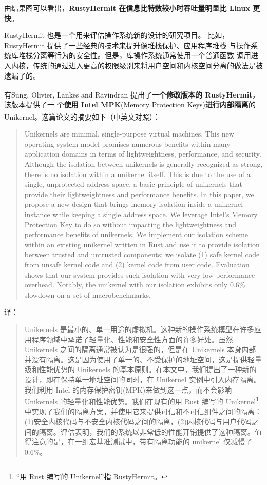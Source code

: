 \documentclass[UTF8,fontset=none,linespread=1.15]{ctexart}
\let\nosupcite\cite
\renewcommand*{\cite}[1]{\textsuperscript{\nosupcite{#1}}}
\begin{document}
由结果图可以看出，\textbf{RustyHermit 在信息比特数较小时吞吐量明显比 Linux 更快}。

RustyHermit 也是一个用来评估操作系统新的设计的研究项目。
比如，RustyHermit 提供了一些经典的技术来提升像堆栈保护、应用程序堆栈
与操作系统库堆栈分离等行为的安全性。但是，库操作系统通常使用一个普通函数
调用进入内核，传统的通过进入更高的权限级别来将用户空间和内核空间分离的做法是被遗漏了的。

有Sung, Olivier, Lankes and Ravindran\cite{bib:18-intra-unikernel}
提出了\textbf{一个修改版本的 RustyHermit}，该版本提供了一
个\textbf{使用 Intel MPK}(Memory Protection Keys)\textbf{进行内部隔离}的
Unikernel。这篇论文的摘要如下（中英文对照）：\cite{bib:19-mpk}

\begin{quote}
Unikernels are minimal, single-purpose virtual machines. This new operating system model promises numerous benefits within many application domains in terms of lightweightness, performance, and security. Although the isolation between unikernels is generally recognized as strong, there is no isolation within a unikernel itself. This is due to the use of a single, unprotected address space, a basic principle of unikernels that provide their lightweightness and performance benefits. In this paper, we propose a new design that brings memory isolation inside a unikernel instance while keeping a single address space. We leverage Intel's Memory Protection Key to do so without impacting the lightweightness and performance benefits of unikernels. We implement our isolation scheme within an existing unikernel written in Rust and use it to provide isolation between trusted and untrusted components: we isolate (1) safe kernel code from unsafe kernel code and (2) kernel code from user code. Evaluation shows that our system provides such isolation with very low performance overhead. Notably, the unikernel with our isolation exhibits only 0.6\% slowdown on a set of macrobenchmarks.
\end{quote}

译：

\begin{quote}
Unikernels 是最小的、单一用途的虚拟机。这种新的操作系统模型在许多应用程序领域中承诺了轻量化、性能和安全性方面的许多好处。虽然 Unikernels 之间的隔离通常被认为是很强的，但是在 Unikernels 本身内部并没有隔离。这是因为使用了单一的、不受保护的地址空间，这是提供轻量级和性能优势的 Unikernels 的基本原则。在本文中，我们提出了一种新的设计，即在保持单一地址空间的同时，在 Unikernel 实例中引入内存隔离。我们利用 Intel 的内存保护密钥(MPK)来做到这一点，而不会影响 Unikernels 的轻量化和性能优势。我们在现有的用 Rust 编写的 Unikernel\footnote{“用 Rust 编写的 Unikernel”指 RustyHermit。} 中实现了我们的隔离方案，并使用它来提供可信和不可信组件之间的隔离：(1)安全内核代码与不安全内核代码之间的隔离，(2)内核代码与用户代码之间的隔离。评估表明，我们的系统以非常低的性能开销提供了这种隔离。值得注意的是，在一组宏基准测试中，带有隔离功能的 unikernel 仅减慢了0.6\%。
\end{quote}
\end{document}
